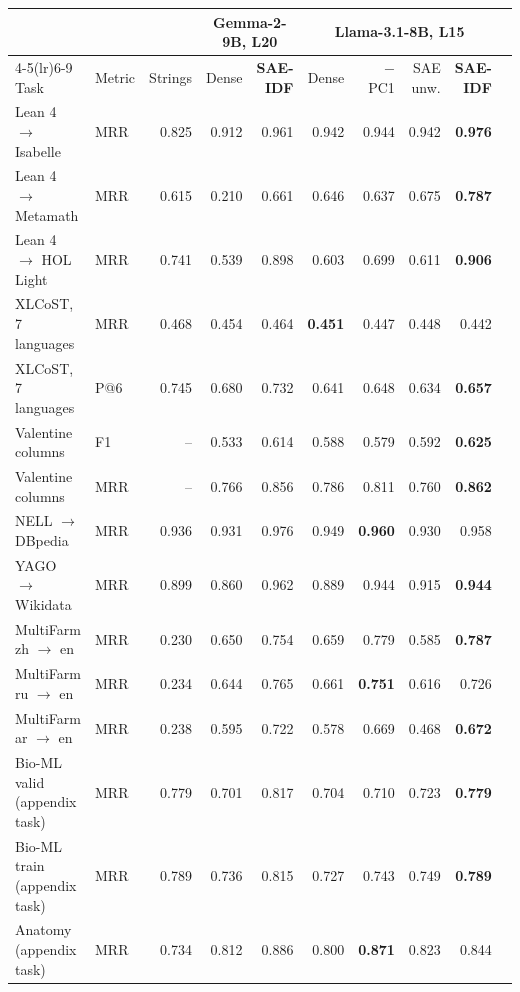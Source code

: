\begin{tabular}{@{}llrrrrrrrr@{}}
\toprule
 & & & \multicolumn{2}{c}{Gemma-2-9B, L20} & \multicolumn{4}{c}{Llama-3.1-8B, L15} \\
\cmidrule(lr){4-5}\cmidrule(lr){6-9}
Task & Metric & Strings & Dense & \textbf{SAE-IDF} & Dense & $-$PC1 & SAE unw. & \textbf{SAE-IDF} \\
\midrule
Lean 4 $\to$ Isabelle & MRR & 0.825 & 0.912 & 0.961 & 0.942 & 0.944 & 0.942 & \textbf{0.976} \\
Lean 4 $\to$ Metamath & MRR & 0.615 & 0.210 & 0.661 & 0.646 & 0.637 & 0.675 & \textbf{0.787} \\
Lean 4 $\to$ HOL Light & MRR & 0.741 & 0.539 & 0.898 & 0.603 & 0.699 & 0.611 & \textbf{0.906} \\
XLCoST, 7 languages & MRR & 0.468 & 0.454 & 0.464 & \textbf{0.451} & 0.447 & 0.448 & 0.442 \\
XLCoST, 7 languages & P@6 & 0.745 & 0.680 & 0.732 & 0.641 & 0.648 & 0.634 & \textbf{0.657} \\
Valentine columns & F1 & -- & 0.533 & 0.614 & 0.588 & 0.579 & 0.592 & \textbf{0.625} \\
Valentine columns & MRR & -- & 0.766 & 0.856 & 0.786 & 0.811 & 0.760 & \textbf{0.862} \\
NELL $\to$ DBpedia & MRR & 0.936 & 0.931 & 0.976 & 0.949 & \textbf{0.960} & 0.930 & 0.958 \\
YAGO $\to$ Wikidata & MRR & 0.899 & 0.860 & 0.962 & 0.889 & 0.944 & 0.915 & \textbf{0.944} \\
MultiFarm zh $\to$ en & MRR & 0.230 & 0.650 & 0.754 & 0.659 & 0.779 & 0.585 & \textbf{0.787} \\
MultiFarm ru $\to$ en & MRR & 0.234 & 0.644 & 0.765 & 0.661 & \textbf{0.751} & 0.616 & 0.726 \\
MultiFarm ar $\to$ en & MRR & 0.238 & 0.595 & 0.722 & 0.578 & 0.669 & 0.468 & \textbf{0.672} \\
\midrule
Bio-ML valid (appendix task) & MRR & 0.779 & 0.701 & 0.817 & 0.704 & 0.710 & 0.723 & \textbf{0.779} \\
Bio-ML train (appendix task) & MRR & 0.789 & 0.736 & 0.815 & 0.727 & 0.743 & 0.749 & \textbf{0.789} \\
Anatomy (appendix task) & MRR & 0.734 & 0.812 & 0.886 & 0.800 & \textbf{0.871} & 0.823 & 0.844 \\
\bottomrule
\end{tabular}
